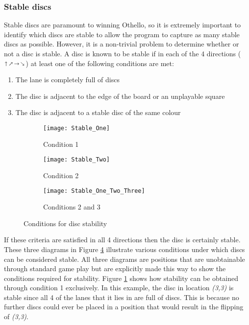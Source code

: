 \documentclass[12pt,a4paper]{article}
\makeatletter
\newcommand{\fixed@sra}{$\vrule height 2\fontdimen22\textfont2 width 0pt\shortrightarrow$}
\newcommand{\shortarrow}[1]{%
  \mathrel{\text{\rotatebox[origin=c]{\numexpr#1*45}{\fixed@sra}}}
}
\makeatother
\begin{document}
\subsubsection*{Stable discs}
Stable discs are paramount to winning Othello, so it is extremely important to identify which discs are stable to allow the program to capture as many stable discs as possible. However, it is a non-trivial problem to determine whether or not a disc is stable. A disc is known to be stable if in each of the 4 directions ($\shortarrow{2} \shortarrow{1} \shortarrow{0} \shortarrow{7}$) at least one of the following conditions are met:

\begin{enumerate}
	\item The lane is completely full of discs
	\item The disc is adjacent to the edge of the board or an unplayable square
	\item The disc is adjacent to a stable disc of the same colour
\end{enumerate}



\begin{figure}[ht]
\centering
\begin{subfigure}{.33\textwidth}
  \centering
  \texttt{[image: Stable\_One]}
  \caption{Condition 1}
  \label{fig:stability_conditions_one}
\end{subfigure}%
\begin{subfigure}{.33\textwidth}
  \centering
  \texttt{[image: Stable\_Two]}
  \caption{Condition 2}
  \label{fig:stability_conditions_two}
\end{subfigure}
\begin{subfigure}{.33\textwidth}
  \centering
  \texttt{[image: Stable\_One\_Two\_Three]}
  \caption{Conditions 2 and 3}
  \label{fig:stability_conditions_three}
\end{subfigure}
\caption{Conditions for disc stability}
\label{fig:Stability_Conditions}
\end{figure}

If these criteria are satisfied in all 4 directions then the disc is certainly stable. These three diagrams in Figure \ref{fig:Stability_Conditions} illustrate various conditions under which discs can be considered stable. All three diagrams are positions that are unobtainable through standard game play but are explicitly made this way to show the conditions required for stability. Figure \ref{fig:stability_conditions_one} shows how stability can be obtained through condition 1 exclusively. In this example, the disc in location \textit{(3,3)} is stable since all 4 of the lanes that it lies in are full of discs. This is because no further discs could ever be placed in a position that would result in the flipping of \textit{(3,3)}.
\end{document}
